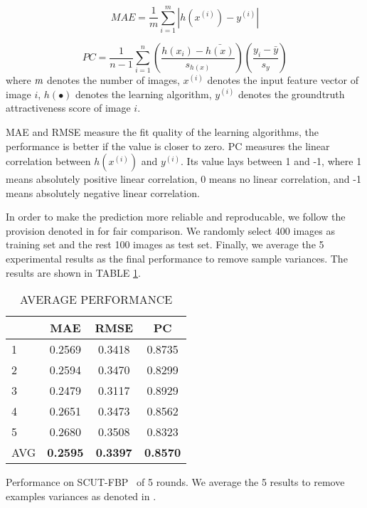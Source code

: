 \documentclass[a4paper,conference]{IEEEtran}
\begin{document}
    \begin{equation}
      MAE=\frac{1}{m} \sum_{i=1}^m|h(x^{(i)})-y^{(i)}|
    \end{equation}

    \begin{equation}
      PC=\frac{1}{n-1}\sum_{i=1}^n
      (\frac{h(x_i)-\bar{h(x)}}{s_{h(x)}})(\frac{y_i-\bar{y}}{s_y})
    \end{equation}
    where $\emph{m}$ denotes the number of images, $x^{(i)}$ denotes the
    input feature vector of image $i$, $h(\bullet)$ denotes the learning algorithm,
    $y^{(i)}$ denotes the groundtruth attractiveness score of image $i$.

    MAE and RMSE measure the fit quality of the learning algorithms,
    the performance is better if the value is closer to zero.
    PC measures the linear correlation between $h(x^{(i)})$ and $y^{(i)}$.
    Its value lays between 1 and -1, where 1 means absolutely positive linear
    correlation, 0 means no linear correlation, and -1 means absolutely negative
    linear correlation.



    In order to make the prediction more reliable and reproducable,
    we follow the provision denoted in \cite{xie2015scut} for fair comparison.
    We randomly select 400 images as training set and the rest 100 images as
    test set. Finally, we average the 5 experimental results as the final
    performance to remove sample variances. The results are shown in
    TABLE \ref{avg performance}.
    \begin{table}[!htb]
      \caption{AVERAGE PERFORMANCE}
      \label{avg performance}
      \begin{center}
        \begin{tabular}{ l | c c c }
        \hline
          & \textbf{MAE} & \textbf{RMSE} & \textbf{PC} \\ \hline\hline
        1 & 0.2569 & 0.3418 & 0.8735 \\
        2 & 0.2594 & 0.3470 & 0.8299 \\
        3 & 0.2479 & 0.3117 & 0.8929 \\
        4 & 0.2651 & 0.3473 & 0.8562 \\
        5 & 0.2680 & 0.3508 & 0.8323 \\ \hline
        AVG & \textbf{0.2595} & \textbf{0.3397} & \textbf{0.8570}\\
        \hline
        \end{tabular}
        \begin{tablenotes}
          \footnotesize
          Performance on SCUT-FBP~\cite{xie2015scut} of 5 rounds. We average
          the 5 results to remove examples variances as denoted in \cite{xie2015scut}.
        \end{tablenotes}
      \end{center}
    \end{table}
\end{document}

